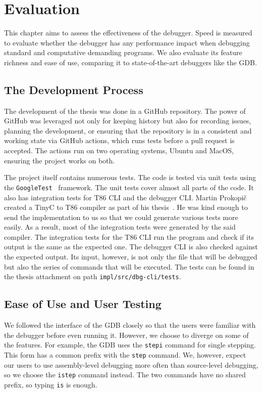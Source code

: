 \chapter{Evaluation}
This chapter aims to assess the effectiveness of the debugger. Speed is
measured to evaluate whether the debugger has any performance impact when
debugging standard and computative demanding programs. We also evaluate its
feature richness and ease of use, comparing it to state-of-the-art debuggers
like the GDB.

\section{The Development Process}
The development of the thesis was done in a GitHub repository. The power of
GitHub was leveraged not only for keeping history but also for recording
issues, planning the development, or ensuring that the repository is in a
consistent and working state via GitHub actions, which runs tests before a pull
request is accepted. The actions run on two operating systems, Ubuntu and
MacOS, ensuring the project works on both.

The project itself contains numerous tests. The code is tested via unit tests
using the \texttt{GoogleTest}~\cite{gtest} framework. The unit tests cover
almost all parts of the code. It also has integration tests for T86 CLI and the
debugger CLI. Martin Prokopič created a TinyC to T86 compiler as part of his
thesis~\cite{martintinyc}. He was kind enough to send the implementation to us
so that we could generate various tests more easily. As a result, most of the
integration tests were generated by the said compiler. The integration tests
for the T86 CLI run the program and check if its output is the same as the
expected one. The debugger CLI is also checked against the expected output. Its
input, however, is not only the file that will be debugged but also the series
of commands that will be executed. The tests can be found in the thesis
attachment on path \texttt{impl/src/dbg-cli/tests}.

\section{Ease of Use and User Testing}
We followed the interface of the GDB closely so that the users were familiar
with the debugger before even running it. However, we choose to diverge on some
of the features. For example, the GDB uses the \texttt{stepi} command for
single stepping. This form has a common prefix with the \texttt{step} command.
We, however, expect our users to use assembly-level debugging more often than
source-level debugging, so we choose the \texttt{istep} command instead. The
two commands have no shared prefix, so typing \texttt{is} is enough.

